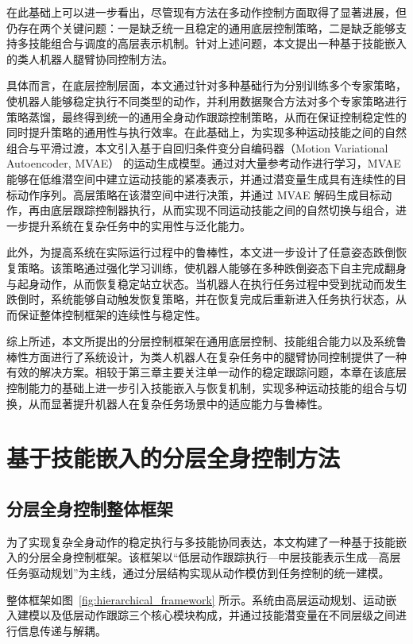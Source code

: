 在此基础上可以进一步看出，尽管现有方法在多动作控制方面取得了显著进展，但仍存在两个关键问题：一是缺乏统一且稳定的通用底层控制策略，二是缺乏能够支持多技能组合与调度的高层表示机制。针对上述问题，本文提出一种基于技能嵌入的类人机器人腿臂协同控制方法。

具体而言，在底层控制层面，本文通过针对多种基础行为分别训练多个专家策略，使机器人能够稳定执行不同类型的动作，并利用数据聚合方法对多个专家策略进行策略蒸馏，最终得到统一的通用全身动作跟踪控制策略，从而在保证控制稳定性的同时提升策略的通用性与执行效率。在此基础上，为实现多种运动技能之间的自然组合与平滑过渡，本文引入基于自回归条件变分自编码器（Motion Variational Autoencoder, MVAE）\cite{ling2020character} 的运动生成模型。通过对大量参考动作进行学习，MVAE 能够在低维潜空间中建立运动技能的紧凑表示，并通过潜变量生成具有连续性的目标动作序列。高层策略在该潜空间中进行决策，并通过 MVAE 解码生成目标动作，再由底层跟踪控制器执行，从而实现不同运动技能之间的自然切换与组合，进一步提升系统在复杂任务中的实用性与泛化能力。

此外，为提高系统在实际运行过程中的鲁棒性，本文进一步设计了任意姿态跌倒恢复策略。该策略通过强化学习训练，使机器人能够在多种跌倒姿态下自主完成翻身与起身动作，从而恢复稳定站立状态。当机器人在执行任务过程中受到扰动而发生跌倒时，系统能够自动触发恢复策略，并在恢复完成后重新进入任务执行状态，从而保证整体控制框架的连续性与稳定性。

综上所述，本文所提出的分层控制框架在通用底层控制、技能组合能力以及系统鲁棒性方面进行了系统设计，为类人机器人在复杂任务中的腿臂协同控制提供了一种有效的解决方案。相较于第三章主要关注单一动作的稳定跟踪问题，本章在该底层控制能力的基础上进一步引入技能嵌入与恢复机制，实现多种运动技能的组合与切换，从而显著提升机器人在复杂任务场景中的适应能力与鲁棒性。




\section{基于技能嵌入的分层全身控制方法}
\subsection{分层全身控制整体框架}
为了实现复杂全身动作的稳定执行与多技能协同表达，本文构建了一种基于技能嵌入的分层全身控制框架。该框架以“低层动作跟踪执行—中层技能表示生成—高层任务驱动规划”为主线，通过分层结构实现从动作模仿到任务控制的统一建模。

整体框架如图~\ref{fig:hierarchical_framework} 所示。系统由高层运动规划、运动嵌入建模以及低层动作跟踪三个核心模块构成，并通过技能潜变量在不同层级之间进行信息传递与解耦。

